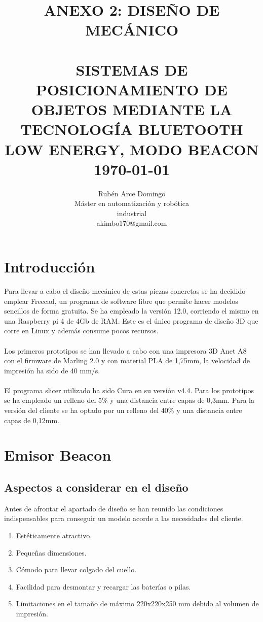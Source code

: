 \documentclass[paper=a4, fontsize=11pt,twoside]{scrartcl}
\title{	\normalsize \textsc{ANEXO 2: DISEÑO DE MECÁNICO} 	%
		 	\\[2.0cm]								%
			\HRule{0.5pt} \\						%
			\LARGE \textbf{\uppercase{Sistemas de posicionamiento de objetos mediante la tecnología Bluetooth Low Energy, modo Beacon}}	%
			\HRule{2pt} \\ [0.5cm]		%
			\normalsize \today			%
		}
\author{
		Rubén Arce Domingo\\	
		Máster en automatización y robótica\\	
		industrial\\
		akimbo170@gmail.com\\
}
\makeatletter
\def\printtitle{%
    {\centering \@title\par}}
\def\printauthor{%
    {\centering \large \@author}}
\makeatother
\begin{document}
\thispagestyle{empty}		%
\printtitle					%
  	\vfill
\printauthor				%
\newpage
\cleardoublepage
\tableofcontents
\listoffigures
\cleardoublepage
\pagestyle{fancy}
\section{Introducción}
    Para llevar a cabo el diseño mecánico de estas piezas concretas se ha decidido emplear Freecad, un
    programa de software libre que permite hacer modelos sencillos de forma gratuita.
    Se ha empleado la versión 12.0, corriendo el mismo en una Raspberry pi 4 de 4Gb de RAM. Este es el único
    programa de diseño 3D que corre en Linux y además consume pocos recursos.
    \paragraph{}
    Los primeros prototipos se han llevado a cabo con una impresora 3D Anet A8 con el firmware de Marling
    2.0 y con material PLA de 1,75mm, la velocidad de impresión ha sido de 40 mm/s.
    \paragraph{}
    El programa slicer utilizado ha sido Cura en su versión v4.4. Para los prototipos se ha empleado un relleno del 5\% y una distancia
    entre capas de 0,3mm. Para la versión del cliente se ha optado por un relleno del 40\% y una distancia entre capas de 0,12mm.
\section{Emisor Beacon}
    \subsection{Aspectos a considerar en el diseño}
        Antes de afrontar el apartado de diseño se han reunido las condiciones indispensables para 
        conseguir un modelo acorde a las necesidades del cliente.
        \begin{enumerate}
            \item Estéticamente atractivo.
            \item Pequeñas dimensiones.
            \item Cómodo para llevar colgado del cuello.
            \item Facilidad para desmontar y recargar las baterías o pilas.
            \item Limitaciones en el tamaño de máximo 220x220x250 mm debido al volumen de impresión.
        \end{enumerate}
\end{document}
